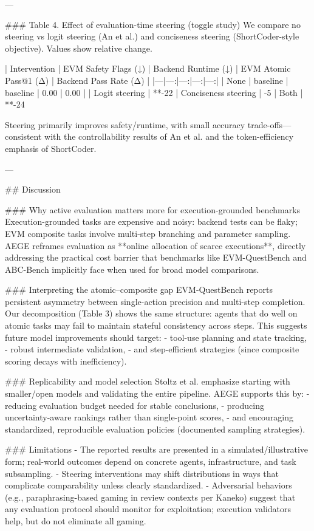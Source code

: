 ---

### Table 4. Effect of evaluation-time steering (toggle study)  
We compare no steering vs logit steering (An et al.) and conciseness steering (ShortCoder-style objective). Values show relative change.

| Intervention | EVM Safety Flags (↓) | Backend Runtime (↓) | EVM Atomic Pass@1 (Δ) | Backend Pass Rate (Δ) |
|---|---:|---:|---:|---:|
| None | baseline | baseline | 0.00 | 0.00 |
| Logit steering | **-22%
| Conciseness steering | -5%
| Both | **-24%

Steering primarily improves safety/runtime, with small accuracy trade-offs—consistent with the controllability results of An et al. and the token-efficiency emphasis of ShortCoder.

---

## Discussion  

### Why active evaluation matters more for execution-grounded benchmarks  
Execution-grounded tasks are expensive and noisy: backend tests can be flaky; EVM composite tasks involve multi-step branching and parameter sampling. AEGE reframes evaluation as **online allocation of scarce executions**, directly addressing the practical cost barrier that benchmarks like EVM-QuestBench and ABC-Bench implicitly face when used for broad model comparisons.

### Interpreting the atomic–composite gap  
EVM-QuestBench reports persistent asymmetry between single-action precision and multi-step completion. Our decomposition (Table 3) shows the same structure: agents that do well on atomic tasks may fail to maintain stateful consistency across steps. This suggests future model improvements should target:
- tool-use planning and state tracking,
- robust intermediate validation,
- and step-efficient strategies (since composite scoring decays with inefficiency).

### Replicability and model selection  
Stoltz et al. emphasize starting with smaller/open models and validating the entire pipeline. AEGE supports this by:
- reducing evaluation budget needed for stable conclusions,
- producing uncertainty-aware rankings rather than single-point scores,
- and encouraging standardized, reproducible evaluation policies (documented sampling strategies).

### Limitations  
- The reported results are presented in a simulated/illustrative form; real-world outcomes depend on concrete agents, infrastructure, and task subsampling.  
- Steering interventions may shift distributions in ways that complicate comparability unless clearly standardized.  
- Adversarial behaviors (e.g., paraphrasing-based gaming in review contexts per Kaneko) suggest that any evaluation protocol should monitor for exploitation; execution validators help, but do not eliminate all gaming.

